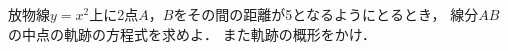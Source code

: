 
\begin{problem}
  放物線$y=x^2$上に2点$A$，$B$をその間の距離が5となるようにとるとき，
線分$AB$の中点の軌跡の方程式を求めよ．
また軌跡の概形をかけ．
\end{problem}

